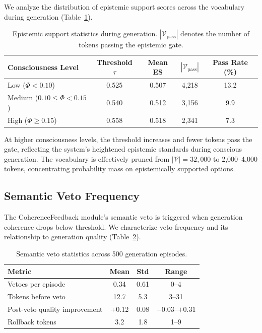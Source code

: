 \documentclass[12pt,a4paper]{article}
\begin{document}
We analyze the distribution of epistemic support scores across the vocabulary during generation (Table~\ref{tab:epistemic-dist}).

\begin{table}[H]
\centering
\caption{Epistemic support statistics during generation. $|\mathcal{V}_{\text{pass}}|$ denotes the number of tokens passing the epistemic gate.}
\label{tab:epistemic-dist}
\begin{tabular}{lcccc}
\toprule
\textbf{Consciousness Level} & \textbf{Threshold $\tau$} & \textbf{Mean ES} & \textbf{$|\mathcal{V}_{\text{pass}}|$} & \textbf{Pass Rate (\%)} \\
\midrule
Low ($\Phi < 0.10$) & 0.525 & 0.507 & 4,218 & 13.2 \\
Medium ($0.10 \leq \Phi < 0.15$) & 0.540 & 0.512 & 3,156 & 9.9 \\
High ($\Phi \geq 0.15$) & 0.558 & 0.518 & 2,341 & 7.3 \\
\bottomrule
\end{tabular}
\end{table}

At higher consciousness levels, the threshold increases and fewer tokens pass the gate, reflecting the system's heightened epistemic standards during conscious generation. The vocabulary is effectively pruned from $|\mathcal{V}| = 32{,}000$ to 2,000--4,000 tokens, concentrating probability mass on epistemically supported options.

\subsection{Semantic Veto Frequency}

The CoherenceFeedback module's semantic veto is triggered when generation coherence drops below threshold. We characterize veto frequency and its relationship to generation quality (Table~\ref{tab:veto}).

\begin{table}[H]
\centering
\caption{Semantic veto statistics across 500 generation episodes.}
\label{tab:veto}
\begin{tabular}{lccc}
\toprule
\textbf{Metric} & \textbf{Mean} & \textbf{Std} & \textbf{Range} \\
\midrule
Vetoes per episode & 0.34 & 0.61 & 0--4 \\
Tokens before veto & 12.7 & 5.3 & 3--31 \\
Post-veto quality improvement & +0.12 & 0.08 & $-0.03$--$+0.31$ \\
Rollback tokens & 3.2 & 1.8 & 1--9 \\
\bottomrule
\end{tabular}
\end{table}
\end{document}
